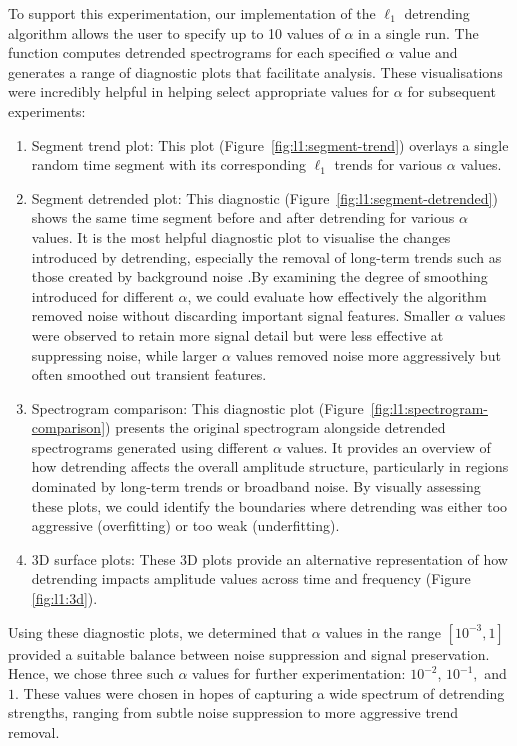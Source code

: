 To support this experimentation, our implementation of the $\ell_1$ detrending algorithm allows the user to specify up to 10 values of $\alpha$ in a single run. The function computes detrended spectrograms for each specified $\alpha$ value and generates a range of diagnostic plots that facilitate analysis. These visualisations were incredibly helpful in helping select appropriate values for $\alpha$ for subsequent experiments:
\begin{enumerate}
    \item Segment trend plot: This plot (Figure~\ref{fig:l1:segment-trend}) overlays a single random time segment with its corresponding $\ell_1$ trends for various $\alpha$ values. 
    \item Segment detrended plot: This diagnostic (Figure~\ref{fig:l1:segment-detrended}) shows the same time segment before and after detrending for various $\alpha$ values. It is the most helpful diagnostic plot to visualise the changes introduced by detrending, especially the removal of long-term trends such as those created by background noise .By examining the degree of smoothing introduced for different $\alpha$, we could evaluate how effectively the algorithm removed noise without discarding important signal features. Smaller $\alpha$ values were observed to retain more signal detail but were less effective at suppressing noise, while larger $\alpha$ values removed noise more aggressively but often smoothed out transient features.
    \item Spectrogram comparison: This diagnostic plot (Figure~\ref{fig:l1:spectrogram-comparison}) presents the original spectrogram alongside detrended spectrograms generated using different $\alpha$ values. It provides an overview of how detrending affects the overall amplitude structure, particularly in regions dominated by long-term trends or broadband noise. By visually assessing these plots, we could identify the boundaries where detrending was either too aggressive (overfitting) or too weak (underfitting).
    \item 3D surface plots: These 3D plots provide an alternative representation of how detrending impacts amplitude values across time and frequency (Figure \ref{fig:l1:3d}).
\end{enumerate}

Using these diagnostic plots, we determined that $\alpha$ values in the range $[10^{-3}, 1]$ provided a suitable balance between noise suppression and signal preservation. Hence, we chose three such $\alpha$ values for further experimentation: $10^{-2}$, $10^{-1},$ and $1$. These values were chosen in hopes of capturing a wide spectrum of detrending strengths, ranging from subtle noise suppression to more aggressive trend removal.

